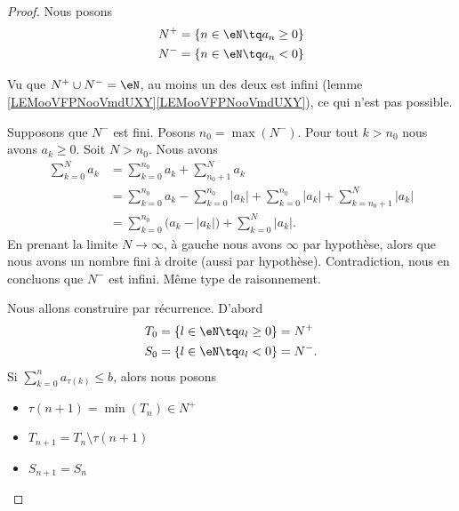 \begin{proof}
	Nous posons
	\begin{subequations}
		\begin{align}
			N^+ & =\{ n\in \eN\tq a_n\geq 0 \} \\
			N^- & =\{ n\in \eN\tq a_n< 0 \}
		\end{align}
	\end{subequations}
	\begin{subproof}

		Vu que \( N^+\cup N^-=\eN\), au moins un des deux est infini (lemme \ref{LEMooVFPNooVmdUXY}\ref{LEMooVFPNooVmdUXY}), ce qui n'est pas possible.


		Supposons que \( N^-\) est fini. Posons \( n_0=\max(N^-)\). Pour tout \( k>n_0\) nous avons \( a_k\geq 0\). Soit \( N>n_0\). Nous avons
		\begin{subequations}
			\begin{align}
				\sum_{k=0}^Na_k & =\sum_{k=0}^{n_0}a_k+\sum_{n_0+1}^Na_k                                                         \\
				                & =\sum_{k=0}^{n_0}a_k-\sum_{k=0}^{n_0}| a_k |+\sum_{k=0}^{n_0}| a_k |+\sum_{k=n_0+1}^{N}| a_k | \\
				                & =\sum_{k=0}^{n_0}\big( a_k-| a_k | \big)+\sum_{k=0}^N| a_k |.
			\end{align}
		\end{subequations}
		En prenant la limite \( N\to\infty\), à gauche nous avons \( \infty\) par hypothèse, alors que nous avons un nombre fini à droite (aussi par hypothèse). Contradiction, nous en concluons que \( N^-\) est infini.
		Même type de raisonnement.

				\label{ITEMooKATRooVrnUBv}

		Nous allons construire par récurrence. D'abord
		\begin{subequations}
			\begin{align}
				T_0 & = \{ l\in \eN\tq a_l\geq 0 \}=N^+ \\
				S_0 & = \{ l\in \eN\tq a_l<0 \}=N^-.
			\end{align}
		\end{subequations}
		Si \( \sum_{k=0}^na_{\tau(k)}\leq b\), alors nous posons
		\begin{itemize}
			\item
			      \( \tau(n+1)=\min(T_n)\in N^+\)
			\item
			      \( T_{n+1}=T_n\setminus \tau(n+1)\)
			\item
			      \( S_{n+1}=S_n\)
		\end{itemize}


\end{subproof}
\end{proof}
